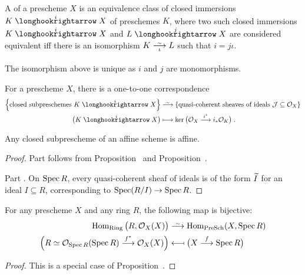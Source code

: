 \documentclass[a4paper,parskip=half,numbers=enddot, DIV=12]{scrreprt}
\begin{document}
\begin{defi}
	A  of a prescheme $X$ is an equivalence class of closed immersions $K\monomorphism[i]X$ of preschemes $K$, where two such closed immersions $K\monomorphism[i]X$ and $L\monomorphism[j]X$ are considered equivalent iff there is an isomorphism $K\isomorphism[\iota]L$ such that $i=j\iota$.
\end{defi}
\begin{rem}
	The isomorphism above is unique as $i$ and $j$ are monomorphisms.
\end{rem}
\begin{cor}
	\begin{alphanumerate}
		\item {} For a prescheme $X$, there is a one-to-one correspondence 
		\begin{align*}
			\left\{\text{closed subpreschemes }K\monomorphism[i]X\right\}&\isomorphism\left\{\text{quasi-coherent sheaves of ideals }\Jj\subseteq\Oo_X\right\}\\
			\big(K\monomorphism[i]X\big)&\longmapsto\ker\big(\Oo_X\morphism[i^*]i_*\Oo_K\big)\;.
		\end{align*}
		\item Any closed subprescheme of an affine scheme is affine.
	\end{alphanumerate}
\end{cor}
\begin{proof}
	Part  follows from Proposition~ and Proposition~.
	
	Part . On $\operatorname{Spec} R$, every quasi-coherent sheaf of ideals is of the form $\snake{I}$ for an ideal $I\subseteq R$, corresponding to $\Spec(R/I)\morphism\Spec R$.
\end{proof}
\begin{cor}
	For any prescheme $X$ and any ring $R$, the following map is bijective:
	\begin{align*}
		\Hom_{\cat{Ring}}\big(R,\Oo_X(X)\big)&\isomorphism\Hom_{\cat{PreSch}}(X,\Spec R)\\
		\Big(R\simeq \Oo_{\Spec R}(\Spec R)\morphism[f^*]\Oo_X(X)\Big)&\longmapsfrom \big(X\morphism[f]\Spec R\big)
	\end{align*}
\end{cor}
\begin{proof}
	This is a special case of Proposition~.
\end{proof}
\end{document}

